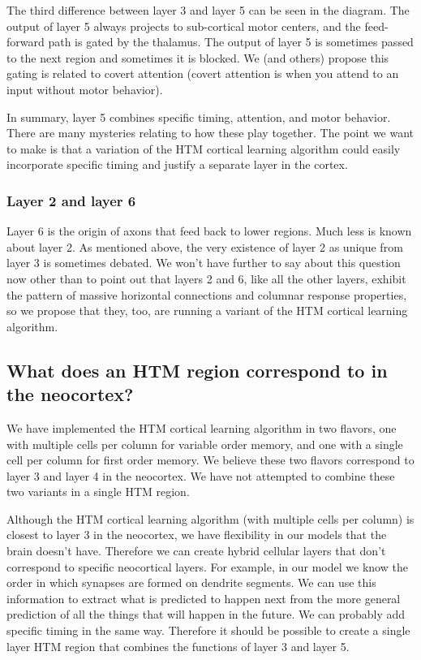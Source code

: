 \documentclass{report}
\begin{document}
The third difference between layer 3 and layer 5 can be seen in the
diagram. The output of layer 5 always projects to sub-cortical motor
centers, and the feed-forward path is gated by the thalamus. The
output of layer 5 is sometimes passed to the next region and sometimes
it is blocked. We (and others) propose this gating is related to
covert attention (covert attention is when you attend to an input
without motor behavior).

In summary, layer 5 combines specific timing, attention, and motor
behavior. There are many mysteries relating to how these play
together. The point we want to make is that a variation of the HTM
cortical learning algorithm could easily incorporate specific timing
and justify a separate layer in the cortex.

\subsubsection*{Layer 2 and layer 6}
Layer 6 is the origin of axons that feed back to lower regions. Much
less is known about layer 2. As mentioned above, the very existence of
layer 2 as unique from layer 3 is sometimes debated. We won't have
further to say about this question now other than to point out that
layers 2 and 6, like all the other layers, exhibit the pattern of
massive horizontal connections and columnar response properties, so we
propose that they, too, are running a variant of the HTM cortical
learning algorithm.

\subsection*{What does an HTM region correspond to in the neocortex?}
We have implemented the HTM cortical learning algorithm in two
flavors, one with multiple cells per column for variable order memory,
and one with a single cell per column for first order memory. We
believe these two flavors correspond to layer 3 and layer 4 in the
neocortex. We have not attempted to combine these two variants in a
single HTM region.

Although the HTM cortical learning algorithm (with multiple cells per
column) is closest to layer 3 in the neocortex, we have flexibility in
our models that the brain doesn't have. Therefore we can create hybrid
cellular layers that don't correspond to specific neocortical
layers. For example, in our model we know the order in which synapses
are formed on dendrite segments. We can use this information to
extract what is predicted to happen next from the more general
prediction of all the things that will happen in the future. We can
probably add specific timing in the same way. Therefore it should be
possible to create a single layer HTM region that combines the
functions of layer 3 and layer 5.
\end{document}
